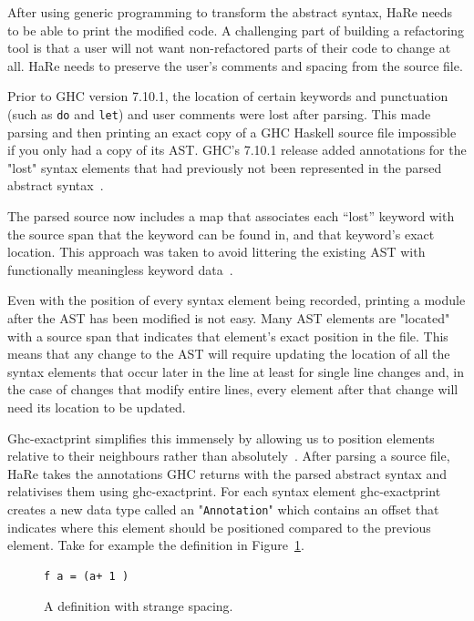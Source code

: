 After using generic programming to transform the abstract syntax, HaRe needs to be able to print the modified code. A challenging part of building a refactoring tool is that a user will not want non-refactored parts of their code to change at all. HaRe needs to preserve the user's comments and spacing from the source file.

Prior to GHC version 7.10.1, the location of certain keywords and punctuation (such as \texttt{do} and \texttt{let}) and user comments were lost after parsing. This made parsing and then printing an exact copy of a GHC Haskell source file impossible if you only had a copy of its AST. GHC's 7.10.1 release added annotations for the "lost" syntax elements that had previously not been represented in the parsed abstract syntax~\citep{apiAnns}. 

The parsed source now includes a map that associates each ``lost'' keyword with the source span that the keyword can be found in, and that keyword's exact location. This approach was taken to avoid littering the existing AST with functionally meaningless keyword data~\citep{apiAnns}. 

Even with the position of every syntax element being recorded, printing a module after the AST has been modified is not easy. Many AST elements are "located" with a source span that indicates that element's exact position in the file. This means that any change to the AST will require updating the location of all the syntax elements that occur later in the line at least for single line changes and, in the case of changes that modify entire lines, every element after that change will need its location to be updated.

Ghc-exactprint simplifies this immensely by allowing us to position elements relative to their neighbours rather than absolutely~\citep{exactprint}. After parsing a source file, HaRe takes the annotations GHC returns with the parsed abstract syntax and relativises them using ghc-exactprint. For each syntax element ghc-exactprint creates a new data type called an "\texttt{Annotation}" which contains an offset that indicates where this element should be positioned compared to the previous element. Take for example the definition in Figure~\ref{strangeSpacing}.

\begin{figure}[t]
\begin{lstlisting} 
f a = (a+ 1 )
\end{lstlisting}
\caption{A definition with strange spacing.}
\label{strangeSpacing}
\end{figure}



